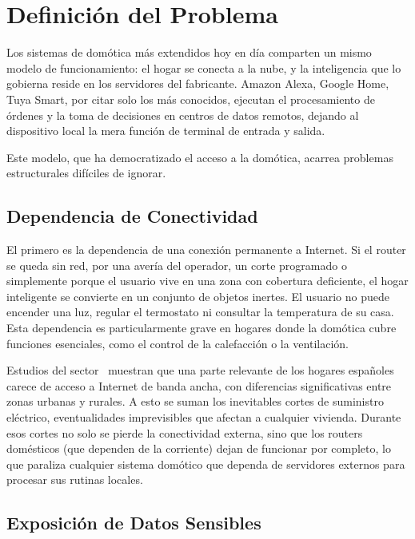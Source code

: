 \chapter{Definición del Problema}
\label{cap:definicion_problema}

Los sistemas de domótica más extendidos hoy en día comparten un mismo modelo de funcionamiento: el hogar se conecta a la nube, y la inteligencia que lo gobierna reside en los servidores del fabricante. Amazon Alexa, Google Home, Tuya Smart, por citar solo los más conocidos, ejecutan el procesamiento de órdenes y la toma de decisiones en centros de datos remotos, dejando al dispositivo local la mera función de terminal de entrada y salida.

Este modelo, que ha democratizado el acceso a la domótica, acarrea problemas estructurales difíciles de ignorar.

\section{Dependencia de Conectividad}

El primero es la dependencia de una conexión permanente a Internet. Si el router se queda sin red, por una avería del operador, un corte programado o simplemente porque el usuario vive en una zona con cobertura deficiente, el hogar inteligente se convierte en un conjunto de objetos inertes. El usuario no puede encender una luz, regular el termostato ni consultar la temperatura de su casa. Esta dependencia es particularmente grave en hogares donde la domótica cubre funciones esenciales, como el control de la calefacción o la ventilación.

Estudios del sector~\cite{cnmc_panel_2025} muestran que una parte relevante de los hogares españoles carece de acceso a Internet de banda ancha, con diferencias significativas entre zonas urbanas y rurales. A esto se suman los inevitables cortes de suministro eléctrico, eventualidades imprevisibles que afectan a cualquier vivienda. Durante esos cortes no solo se pierde la conectividad externa, sino que los routers domésticos (que dependen de la corriente) dejan de funcionar por completo, lo que paraliza cualquier sistema domótico que dependa de servidores externos para procesar sus rutinas locales.

\section{Exposición de Datos Sensibles}

